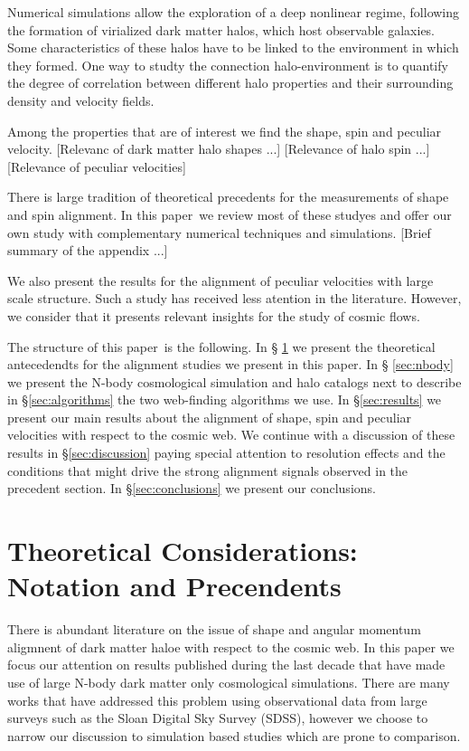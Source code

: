 \documentclass[useAMS,usenatbib]{mn2e}
\newcommand{\documentname}{paper~}
\begin{document}
Numerical simulations allow the exploration of a deep nonlinear
regime, following the formation of virialized dark matter halos, which
host observable galaxies. Some characteristics of these halos have to
be linked to the environment in which they formed. One way to studty
the connection halo-environment is to quantify the degree of
correlation between different halo properties and their surrounding
density and velocity fields. 


Among the properties that are of interest we find the shape, spin and
peculiar velocity. [Relevanc of dark matter halo shapes ...]
[Relevance of halo spin ...] [Relevance of peculiar velocities]

There is large tradition of theoretical precedents for the
measurements of shape and spin alignment. In this \documentname we
review most of these studyes and offer our own study with
complementary numerical techniques and simulations. [Brief summary of
  the appendix ...]

We also present the results for the alignment of peculiar velocities
with large scale structure. Such a study has received less atention in
the literature. However, we consider that it presents relevant
insights for the study of cosmic flows.

The structure of this \documentname is the following. In \S
\ref{sec:theory} we present the theoretical antecedendts for the
alignment studies we present in this paper. In \S
\ref{sec:nbody} we present the N-body
cosmological simulation and halo catalogs next to describe in
\S\ref{sec:algorithms} the two web-finding algorithms we use. In
\S\ref{sec:results} we present our main results about the alignment
of shape, spin and peculiar velocities with respect to the cosmic
web. We continue with a discussion of these results in
\S\ref{sec:discussion} paying special attention to resolution effects
and the conditions that might drive the strong alignment signals
observed in the precedent section. In \S\ref{sec:conclusions} we
present our conclusions.


\section{Theoretical Considerations: Notation and Precendents}
\label{sec:theory}

There is abundant literature on the issue of shape and angular momentum
aligmnent of dark matter haloe with respect to the cosmic web. In this
paper we focus our attention on results published during the last
decade that have made use of large N-body dark matter only
cosmological simulations. There are many works that have addressed
this problem using observational data from large surveys such as the
Sloan Digital Sky Survey (SDSS), however we choose to narrow our
discussion to simulation based studies which are prone to comparison.
\end{document}
